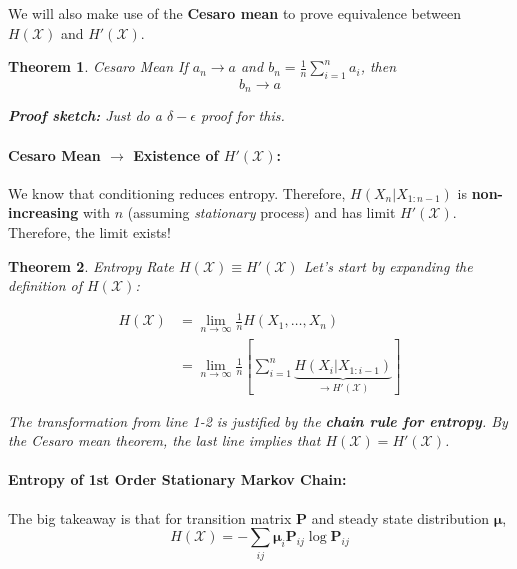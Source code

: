 \documentclass[a4paper,12pt]{report}
\newtheorem{theorem}{Theorem}
\begin{document}
We will also make use of the \textbf{Cesaro mean} to prove equivalence between
$H(\mathcal X)$ and $H'(\mathcal X)$.

\begin{theorem}{Cesaro Mean}
If $a_n \to a$ and $b_n = \frac 1 n \sum_{i=1}^{n} a_i$, then 
\begin{equation}
	b_n \to a
\end{equation}

\textbf{Proof sketch:} Just do a $\delta-\epsilon$ proof for this. 
\end{theorem}



\paragraph{Cesaro Mean $\to$ Existence of $H'(\mathcal X)$: } We know that
conditioning reduces entropy. Therefore, $H(X_n | X_{1:n-1})$ is
\textbf{non-increasing} with $n$ (assuming \textit{stationary} process) and has
limit $H'(\mathcal X)$. Therefore, the limit exists! \qedsymbol{}



\begin{theorem}{Entropy Rate $H(\mathcal X) \equiv H'(\mathcal X)$}
Let's start by expanding the definition of $H(\mathcal X)$: 

\begin{align}
	H(\mathcal X) &= \lim_{n\to \infty} \frac 1 n H(X_1, \dots, X_n) \\ 
				  &= \lim_{n\to \infty} \frac 1 n \left[
					\sum_{i=1}^{n} \underbrace{H(X_i | X_{1:i-1})}_{
						\to H'(\mathcal X)
					}
				  \right]
\end{align}

The transformation from line 1-2 is justified by the \textbf{chain rule for
entropy}. By the Cesaro mean theorem, the last line implies that $H(\mathcal X)
= H'(\mathcal X)$. \qedsymbol{}

\end{theorem}



\paragraph{Entropy of 1st Order Stationary Markov Chain: } The big takeaway is
that for transition matrix $\mathbf P$ and steady state distribution $\mathbf \mu$, 
\begin{equation}
	H(\mathcal X) = - \sum_{ij} \mathbf \mu_{i} \mathbf P_{ij} \log \mathbf P_{ij}
\end{equation}
\end{document}
